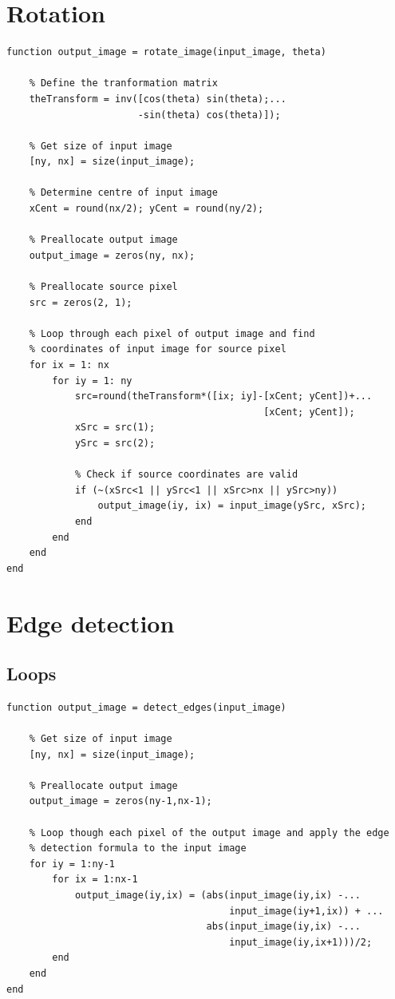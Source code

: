 \section{Rotation}
\begin{minipage}{\textwidth}
\begin{lstlisting}
function output_image = rotate_image(input_image, theta)
   
    % Define the tranformation matrix
    theTransform = inv([cos(theta) sin(theta);...
                       -sin(theta) cos(theta)]); 
    
    % Get size of input image
    [ny, nx] = size(input_image); 
    
    % Determine centre of input image
    xCent = round(nx/2); yCent = round(ny/2); 
    
    % Preallocate output image
    output_image = zeros(ny, nx); 
    
    % Preallocate source pixel
    src = zeros(2, 1); 
    
    % Loop through each pixel of output image and find
    % coordinates of input image for source pixel
    for ix = 1: nx 
        for iy = 1: ny 
            src=round(theTransform*([ix; iy]-[xCent; yCent])+...
                                             [xCent; yCent]); 
            xSrc = src(1); 
            ySrc = src(2);
        
            % Check if source coordinates are valid
            if (~(xSrc<1 || ySrc<1 || xSrc>nx || ySrc>ny))
                output_image(iy, ix) = input_image(ySrc, xSrc); 
            end
        end
    end
end
\end{lstlisting}
\end{minipage}

\section{Edge detection}

\subsection{Loops}
\begin{minipage}{\textwidth}
\begin{lstlisting}
function output_image = detect_edges(input_image)
    
    % Get size of input image
    [ny, nx] = size(input_image);
    
    % Preallocate output image
    output_image = zeros(ny-1,nx-1);
    
    % Loop though each pixel of the output image and apply the edge
    % detection formula to the input image
    for iy = 1:ny-1
        for ix = 1:nx-1
            output_image(iy,ix) = (abs(input_image(iy,ix) -... 
                                       input_image(iy+1,ix)) + ...
                                   abs(input_image(iy,ix) -... 
                                       input_image(iy,ix+1)))/2;
        end
    end 
end
\end{lstlisting}
\end{minipage}

